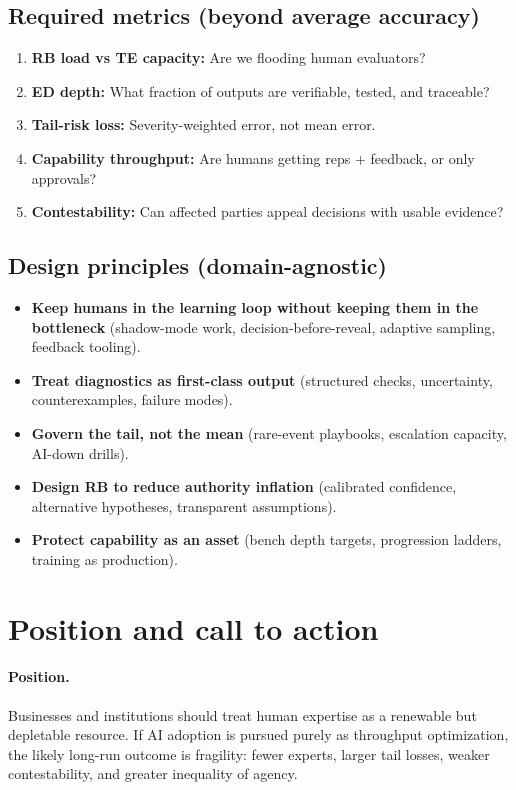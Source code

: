 \subsection{Required metrics (beyond average accuracy)}
\begin{enumerate}[label=\arabic*., leftmargin=*]
  \item \textbf{RB load vs TE capacity:} Are we flooding human evaluators?
  \item \textbf{ED depth:} What fraction of outputs are verifiable, tested, and traceable?
  \item \textbf{Tail-risk loss:} Severity-weighted error, not mean error.
  \item \textbf{Capability throughput:} Are humans getting reps + feedback, or only approvals?
  \item \textbf{Contestability:} Can affected parties appeal decisions with usable evidence?
\end{enumerate}

\subsection{Design principles (domain-agnostic)}
\begin{itemize}[leftmargin=*]
  \item \textbf{Keep humans in the learning loop without keeping them in the bottleneck} (shadow-mode work, decision-before-reveal, adaptive sampling, feedback tooling).
  \item \textbf{Treat diagnostics as first-class output} (structured checks, uncertainty, counterexamples, failure modes).
  \item \textbf{Govern the tail, not the mean} (rare-event playbooks, escalation capacity, AI-down drills).
  \item \textbf{Design RB to reduce authority inflation} (calibrated confidence, alternative hypotheses, transparent assumptions).
  \item \textbf{Protect capability as an asset} (bench depth targets, progression ladders, training as production).
\end{itemize}

\section{Position and call to action}
\paragraph{Position.}
Businesses and institutions should treat human expertise as a renewable but depletable resource. If AI adoption is pursued purely as throughput optimization, the likely long-run outcome is fragility: fewer experts, larger tail losses, weaker contestability, and greater inequality of agency.

